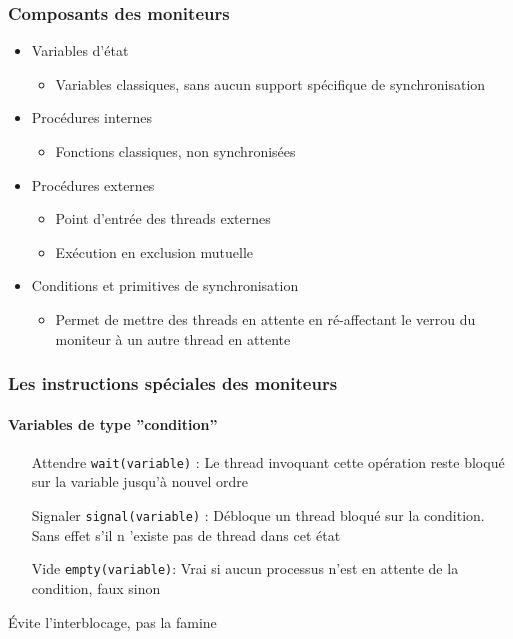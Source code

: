 \begin{frame}
\frametitle{Composants des moniteurs}
\begin{itemize}
\item <1-> Variables d'état
\begin{itemize}
\item Variables classiques, sans aucun support spécifique de synchronisation
\end{itemize}
\item <1-> Procédures internes
\begin{itemize}
\item Fonctions classiques, non synchronisées
\end{itemize}
\item <2-> Procédures externes
\begin{itemize}
\item Point d'entrée des threads externes
\item Exécution en exclusion mutuelle
\end{itemize}
\item <3-> Conditions et primitives de synchronisation\begin{itemize}
\item Permet de mettre des threads en attente en ré-affectant le verrou du moniteur à un autre thread en attente
\end{itemize}
\end{itemize}
\end{frame}

\begin{frame}
\frametitle{Les instructions spéciales des moniteurs}
\framesubtitle{Variables de type ''condition''}
\begin{itemize}
\item [Attendre] \texttt{wait(variable)} : Le thread invoquant cette opération reste bloqué sur la variable jusqu’à nouvel ordre
\item [Signaler] \texttt{signal(variable)} : Débloque un thread bloqué sur la condition. Sans effet s’il n ’existe pas de thread dans cet état
\item [Vide] \texttt{empty(variable)}: Vrai si aucun processus n'est en attente de la condition, faux sinon
\end{itemize}
\end{frame}

\begin{frame}
\begin{multicols}{2}
\begin{scriptsize}\end{scriptsize}
\end{multicols}
\begin{center}
Évite l’interblocage, pas la famine
\end{center}
\end{frame}

